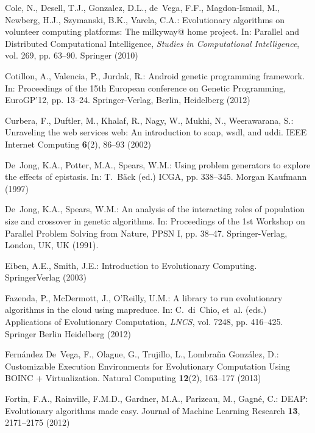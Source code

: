 \begin{thebibliography}{10}
Cole, N., Desell, T.J., Gonzalez, D.L., de~Vega, F.F., Magdon-Ismail, M.,
  Newberg, H.J., Szymanski, B.K., Varela, C.A.: Evolutionary algorithms on
  volunteer computing platforms: The milkyway@ home project.
\newblock In: Parallel and Distributed Computational Intelligence,
  \emph{Studies in Computational Intelligence}, vol. 269, pp. 63--90. Springer
  (2010)

Cotillon, A., Valencia, P., Jurdak, R.: Android genetic programming framework.
\newblock In: Proceedings of the 15th European conference on Genetic
  Programming, EuroGP'12, pp. 13--24. Springer-Verlag, Berlin, Heidelberg
  (2012)

Curbera, F., Duftler, M., Khalaf, R., Nagy, W., Mukhi, N., Weerawarana, S.:
  Unraveling the web services web: An introduction to soap, wsdl, and uddi.
\newblock IEEE Internet Computing \textbf{6}(2), 86--93 (2002)

De~Jong, K.A., Potter, M.A., Spears, W.M.: Using problem generators to explore
  the effects of epistasis.
\newblock In: T.~B\"ack (ed.) ICGA, pp. 338--345. Morgan Kaufmann (1997)

De~Jong, K.A., Spears, W.M.: An analysis of the interacting roles of population
  size and crossover in genetic algorithms.
\newblock In: Proceedings of the 1st Workshop on Parallel Problem Solving from
  Nature, PPSN I, pp. 38--47. Springer-Verlag, London, UK, UK (1991).

Eiben, A.E., Smith, J.E.: Introduction to Evolutionary Computing.
\newblock SpringerVerlag (2003)

Fazenda, P., McDermott, J., O'Reilly, U.M.: A library to run evolutionary
  algorithms in the cloud using mapreduce.
\newblock In: C.~di~Chio, et~al. (eds.) Applications of Evolutionary
  Computation, \emph{LNCS}, vol. 7248, pp. 416--425. Springer Berlin Heidelberg
  (2012)

Fern\'{a}ndez De~Vega, F., Olague, G., Trujillo, L., Lombra\~{n}a Gonz\'{a}lez,
  D.: {Customizable Execution Environments for Evolutionary Computation Using
  BOINC + Virtualization}.
\newblock Natural Computing \textbf{12}(2), 163--177 (2013)

Fortin, F.A., Rainville, F.M.D., Gardner, M.A., Parizeau, M., Gagn\'e, C.:
  {DEAP}: Evolutionary algorithms made easy.
\newblock Journal of Machine Learning Research \textbf{13}, 2171--2175 (2012)


\end{thebibliography}

